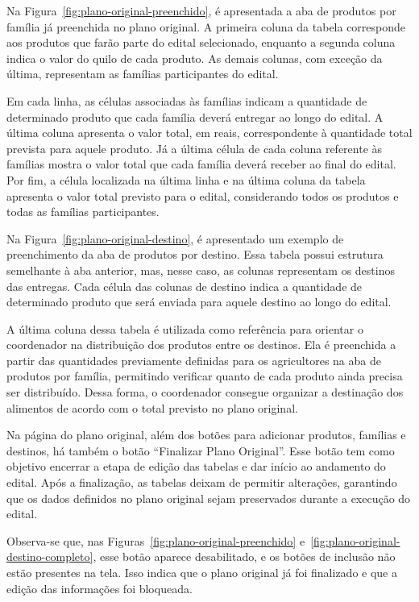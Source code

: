 Na Figura~\ref{fig:plano-original-preenchido}, é apresentada a aba de produtos por família já preenchida no plano original. A primeira coluna da tabela corresponde aos produtos que farão parte do edital selecionado, enquanto a segunda coluna indica o valor do quilo de cada produto. As demais colunas, com exceção da última, representam as famílias participantes do edital.

Em cada linha, as células associadas às famílias indicam a quantidade de determinado produto que cada família deverá entregar ao longo do edital. A última coluna apresenta o valor total, em reais, correspondente à quantidade total prevista para aquele produto. Já a última célula de cada coluna referente às famílias mostra o valor total que cada família deverá receber ao final do edital. Por fim, a célula localizada na última linha e na última coluna da tabela apresenta o valor total previsto para o edital, considerando todos os produtos e todas as famílias participantes.

Na Figura~\ref{fig:plano-original-destino}, é apresentado um exemplo de preenchimento da aba de produtos por destino. Essa tabela possui estrutura semelhante à aba anterior, mas, nesse caso, as colunas representam os destinos das entregas. Cada célula das colunas de destino indica a quantidade de determinado produto que será enviada para aquele destino ao longo do edital.

A última coluna dessa tabela é utilizada como referência para orientar o coordenador na distribuição dos produtos entre os destinos. Ela é preenchida a partir das quantidades previamente definidas para os agricultores na aba de produtos por família, permitindo verificar quanto de cada produto ainda precisa ser distribuído. Dessa forma, o coordenador consegue organizar a destinação dos alimentos de acordo com o total previsto no plano original.

Na página do plano original, além dos botões para adicionar produtos, famílias e destinos, há também o botão “Finalizar Plano Original”. Esse botão tem como objetivo encerrar a etapa de edição das tabelas e dar início ao andamento do edital. Após a finalização, as tabelas deixam de permitir alterações, garantindo que os dados definidos no plano original sejam preservados durante a execução do edital.

Observa-se que, nas Figuras~\ref{fig:plano-original-preenchido} e~\ref{fig:plano-original-destino-completo}, esse botão aparece desabilitado, e os botões de inclusão não estão presentes na tela. Isso indica que o plano original já foi finalizado e que a edição das informações foi bloqueada.


